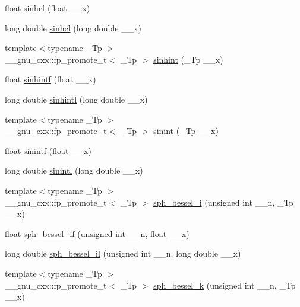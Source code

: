 \begin{DoxyCompactItemize}
\item 
float \hyperlink{group__mathsf__gnu_gadaa7ea78625cc2eeb70213a50719813d}{sinhcf} (float \+\_\+\+\_\+x)
\item 
long double \hyperlink{group__mathsf__gnu_ga7467a001bb18ef8bff0a7e9927bab356}{sinhcl} (long double \+\_\+\+\_\+x)
\item 
{\footnotesize template$<$typename \+\_\+\+Tp $>$ }\\\+\_\+\+\_\+gnu\+\_\+cxx\+::fp\+\_\+promote\+\_\+t$<$ \+\_\+\+Tp $>$ \hyperlink{group__mathsf__gnu_gab5cbc831c5fab99a967c03d059f1ad59}{sinhint} (\+\_\+\+Tp \+\_\+\+\_\+x)
\item 
float \hyperlink{group__mathsf__gnu_ga375ca3ceb1eafd678e298d0aea4bb3e6}{sinhintf} (float \+\_\+\+\_\+x)
\item 
long double \hyperlink{group__mathsf__gnu_ga8b7f1a070be7233a3179e3cbded387ee}{sinhintl} (long double \+\_\+\+\_\+x)
\item 
{\footnotesize template$<$typename \+\_\+\+Tp $>$ }\\\+\_\+\+\_\+gnu\+\_\+cxx\+::fp\+\_\+promote\+\_\+t$<$ \+\_\+\+Tp $>$ \hyperlink{group__mathsf__gnu_ga076c8d52588904f5711c41781f8acfa0}{sinint} (\+\_\+\+Tp \+\_\+\+\_\+x)
\item 
float \hyperlink{group__mathsf__gnu_ga8b63406fec50d7e00470521b82fb32a2}{sinintf} (float \+\_\+\+\_\+x)
\item 
long double \hyperlink{group__mathsf__gnu_ga3ff83e5c5f1435064b6942ca8b7c8779}{sinintl} (long double \+\_\+\+\_\+x)
\item 
{\footnotesize template$<$typename \+\_\+\+Tp $>$ }\\\+\_\+\+\_\+gnu\+\_\+cxx\+::fp\+\_\+promote\+\_\+t$<$ \+\_\+\+Tp $>$ \hyperlink{group__mathsf__gnu_ga156b8154b27b7898c8b2abf4284f7323}{sph\+\_\+bessel\+\_\+i} (unsigned int \+\_\+\+\_\+n, \+\_\+\+Tp \+\_\+\+\_\+x)
\item 
float \hyperlink{group__mathsf__gnu_gacc6738f18c1ba19452b9dd814d11c00c}{sph\+\_\+bessel\+\_\+if} (unsigned int \+\_\+\+\_\+n, float \+\_\+\+\_\+x)
\item 
long double \hyperlink{group__mathsf__gnu_gaf4392d9ed177913febdcbfccb947dbca}{sph\+\_\+bessel\+\_\+il} (unsigned int \+\_\+\+\_\+n, long double \+\_\+\+\_\+x)
\item 
{\footnotesize template$<$typename \+\_\+\+Tp $>$ }\\\+\_\+\+\_\+gnu\+\_\+cxx\+::fp\+\_\+promote\+\_\+t$<$ \+\_\+\+Tp $>$ \hyperlink{group__mathsf__gnu_ga288b28f2c6995d052a4f5f17293cbf1a}{sph\+\_\+bessel\+\_\+k} (unsigned int \+\_\+\+\_\+n, \+\_\+\+Tp \+\_\+\+\_\+x)

\end{DoxyCompactItemize}
